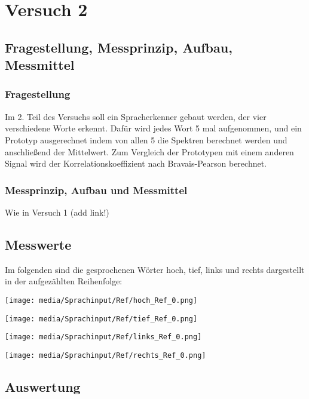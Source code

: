 \chapter{Versuch 2}
\label{chap:VERSUCH-2}


\section{Fragestellung, Messprinzip, Aufbau, Messmittel}
\label{chap:VERSUCH-2-FRAGESTELLUNG}

\subsection*{Fragestellung}
Im 2. Teil des Versuchs soll ein Spracherkenner gebaut werden, der vier verschiedene Worte erkennt. Dafür wird jedes Wort 5 mal aufgenommen,
und ein Prototyp ausgerechnet indem von allen 5 die Spektren berechnet werden und anschließend der Mittelwert. Zum Vergleich der Prototypen mit einem
anderen Signal wird der Korrelationskoeffizient nach Bravais-Pearson berechnet.

\subsection*{Messprinzip, Aufbau und Messmittel}

Wie in Versuch 1 (add link!)


\section{Messwerte}
\label{chap:VERSUCH-2-MESSWERTE}

Im folgenden sind die gesprochenen Wörter hoch, tief, links und rechts dargestellt in der aufgezählten Reihenfolge:

\texttt{[image: media/Sprachinput/Ref/hoch\_Ref\_0.png]}

\texttt{[image: media/Sprachinput/Ref/tief\_Ref\_0.png]}


\texttt{[image: media/Sprachinput/Ref/links\_Ref\_0.png]}


\texttt{[image: media/Sprachinput/Ref/rechts\_Ref\_0.png]}


\section{Auswertung}
\label{chap:VERSUCH-2-AUSWERTUNG}

